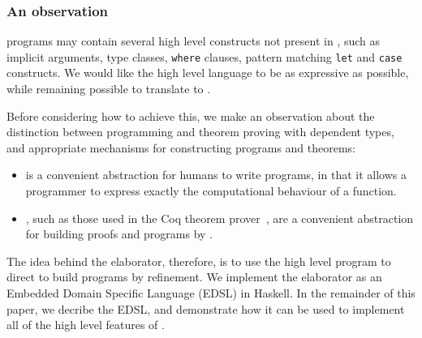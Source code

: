 \subsubsection{An observation}

\Idris{} programs may contain several high level constructs not present in \TT{}, such
as implicit arguments, type classes, \texttt{where} clauses, pattern matching \texttt{let}
and \texttt{case} constructs. We would like the high level language to be as expressive
as possible, while remaining possible to translate to \TT{}.

Before considering how to achieve this, we make an observation about the distinction between
programming and theorem proving with dependent types, and appropriate mechanisms for
constructing programs and theorems:

\begin{itemize}
\item {} is a convenient abstraction for humans to write programs,
in that it allows a programmer to express exactly the computational behaviour of a function.
\item {}, such as those used in the Coq theorem prover~\cite{Bertot2004},
are a convenient abstraction for building proofs and programs by .
\end{itemize}

The idea behind the \Idris{} elaborator, therefore, is to use the high level program
to direct  to build \TT{} programs by refinement. We implement the
elaborator as an Embedded Domain Specific Language (EDSL) in Haskell. 
In the remainder
of this paper, we decribe the EDSL, and demonstrate how it can be used to implement
all of the high level features of \Idris{}.




